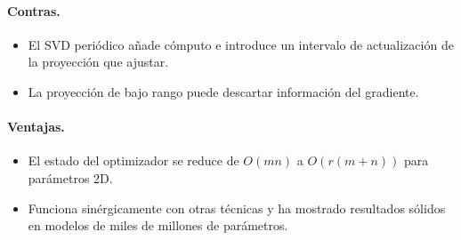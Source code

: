 \paragraph{Contras.}
\begin{itemize}[leftmargin=*]
\item El SVD periódico añade cómputo e introduce un intervalo de actualización de la proyección que ajustar.
\item La proyección de bajo rango puede descartar información del gradiente.
\end{itemize}

\paragraph{Ventajas.}
\begin{itemize}[leftmargin=*]
\item El estado del optimizador se reduce de $O(mn)$ a $O(r(m+n))$ para parámetros 2D.
\item Funciona sinérgicamente con otras técnicas y ha mostrado resultados sólidos en modelos de miles de millones de parámetros.
\end{itemize}

